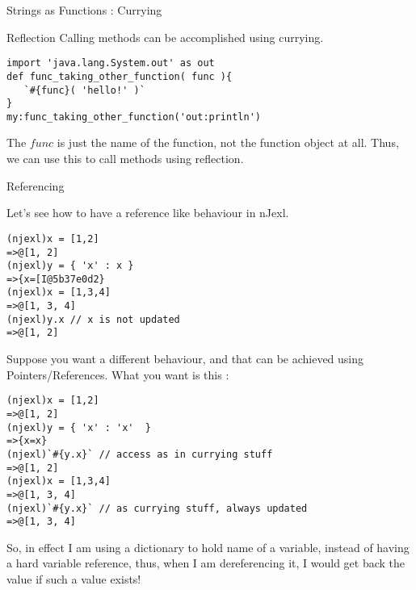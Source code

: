 \begin{section}{Strings as Functions : Currying}
\begin{subsection}{Reflection}
Calling methods can be accomplished using currying. 

\begin{lstlisting}[style=JexlStyle]
import 'java.lang.System.out' as out 
def func_taking_other_function( func ){
   `#{func}( 'hello!' )`
}
my:func_taking_other_function('out:println')
\end{lstlisting}
The $func$ is just the name of the function, not the function object at all.
Thus, we can use this to call methods using reflection.
\end{subsection}

\begin{subsection}{Referencing}

Let's see how to have a reference like behaviour in nJexl.

\begin{lstlisting}[style=all]
(njexl)x = [1,2]
=>@[1, 2]
(njexl)y = { 'x' : x }
=>{x=[I@5b37e0d2}
(njexl)x = [1,3,4]
=>@[1, 3, 4]
(njexl)y.x // x is not updated 
=>@[1, 2]
\end{lstlisting}

Suppose you want a different behaviour, and that can be achieved using Pointers/References. 
What you want is this :

\begin{center}\begin{minipage}{\linewidth}
\begin{lstlisting}[style=all]
(njexl)x = [1,2]
=>@[1, 2]
(njexl)y = { 'x' : 'x'  }
=>{x=x}
(njexl)`#{y.x}` // access as in currying stuff
=>@[1, 2]
(njexl)x = [1,3,4]
=>@[1, 3, 4]
(njexl)`#{y.x}` // as currying stuff, always updated 
=>@[1, 3, 4]
\end{lstlisting}
\end{minipage}\end{center}

So, in effect I am using a dictionary to hold name of a variable, instead of having a hard variable reference, 
thus, when I am dereferencing it, I would get back the value if such a value exists!

\end{subsection}

\end{section}

